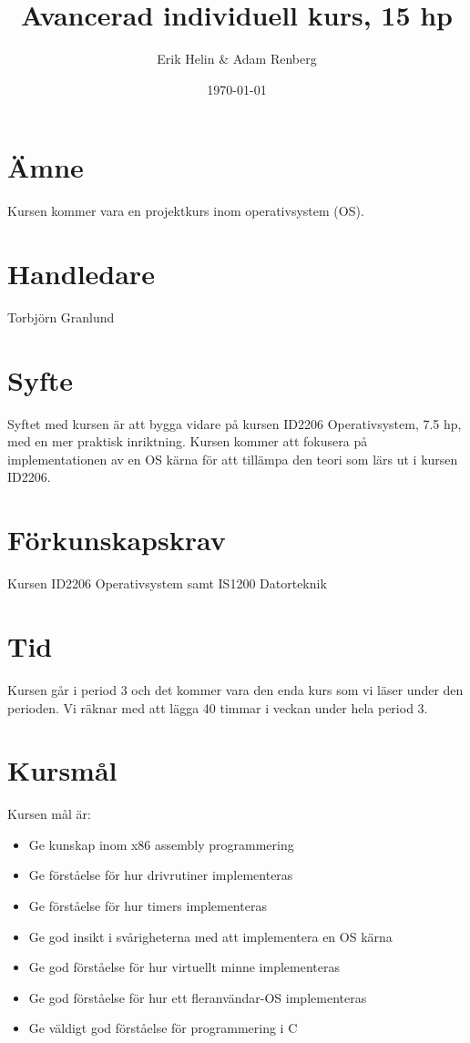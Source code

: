 \documentclass[11pt,oneside,a4paper]{article}
\begin{document}
\title{Avancerad individuell kurs, 15 hp}
\author{Erik Helin \& Adam Renberg}
\date{\today}
\maketitle

\section{Ämne}
Kursen kommer vara en projektkurs inom operativsystem (OS).

\section{Handledare}
Torbjörn Granlund

\section{Syfte}
Syftet med kursen är att bygga vidare på kursen ID2206 Operativsystem, 
7.5 hp, med en mer praktisk inriktning. Kursen kommer att fokusera 
på implementationen av en OS kärna för att tillämpa den teori som lärs 
ut i kursen ID2206.

\section{Förkunskapskrav}
Kursen ID2206 Operativsystem samt IS1200 Datorteknik

\section{Tid}
Kursen går i period 3 och det kommer vara den enda kurs som vi läser under
den perioden. Vi räknar med att lägga 40 timmar i veckan under hela period 3.

\section{Kursmål}
Kursen mål är:
\begin{itemize}
    \item Ge kunskap inom x86 assembly programmering
    \item Ge förståelse för hur drivrutiner implementeras
    \item Ge förståelse för hur timers implementeras
    \item Ge god insikt i svårigheterna med att implementera en OS kärna
    \item Ge god förståelse för hur virtuellt minne implementeras
    \item Ge god förståelse för hur ett fleranvändar-OS implementeras
    \item Ge väldigt god förståelse för programmering i C
\end{itemize}
\end{document}
